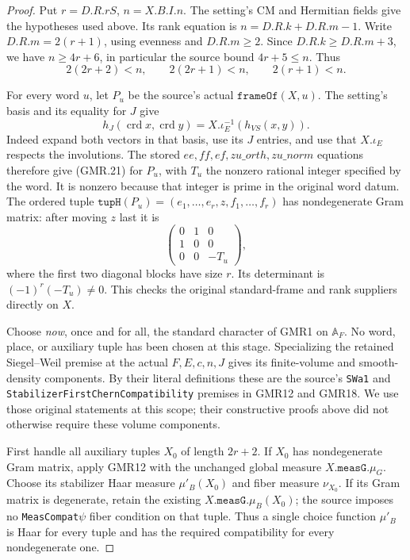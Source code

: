 \begin{proof}
Put $r=D.R.rS$, $n=X.B.I.n$.  The setting's CM and Hermitian fields
give the hypotheses used above.  Its rank equation is
$n=D.R.k+D.R.m-1$.  Write $D.R.m=2(r+1)$, using evenness and
$D.R.m\geq2$.  Since $D.R.k\geq D.R.m+3$, we have
$n\geq4r+6$, in particular the source bound $4r+5\leq n$.
Thus
\[
 2(2r+2)<n,\qquad 2(2r+1)<n,\qquad 2(r+1)<n.
 \tag{GMR.30}
\]

For every word $u$, let $P_u$ be the source's actual
$\texttt{frameOf}(X,u)$.  The setting's basis and its equality for
$J$ give
\[
 h_J(\operatorname{crd}x,\operatorname{crd}y)
   =X.\iota_E^{-1}(h_{VS}(x,y)).
 \tag{GMR.31}
\]
Indeed expand both vectors in that basis, use its $J$ entries, and
use that $X.\iota_E$ respects the involutions.  The stored
$ee,ff,ef,zu\_orth,zu\_norm$ equations therefore give (GMR.21)
for $P_u$, with $T_u$ the nonzero rational integer specified by the
word.  It is nonzero because that integer is prime in the original
word datum.  The ordered tuple
$\texttt{tupH}(P_u)=(e_1,\ldots,e_r,z,f_1,\ldots,f_r)$ has
nondegenerate Gram matrix: after moving $z$ last it is
\[
 \begin{pmatrix}0&1&0\\1&0&0\\0&0&-T_u\end{pmatrix},
 \tag{GMR.32}
\]
where the first two diagonal blocks have size $r$.  Its determinant
is $(-1)^r(-T_u)\ne0$.  This checks the original standard-frame
and rank suppliers directly on $X$.

Choose \emph{now}, once and for all, the standard character of GMR1
on $\mathbb A_F$.  No word, place, or auxiliary tuple has been chosen
at this stage.  Specializing the retained Siegel--Weil premise at
the actual $F,E,c,n,J$ gives its finite-volume and smooth-density
components.  By their literal definitions these are the source's
\texttt{SWa1} and \texttt{StabilizerFirstChernCompatibility} premises
in GMR12 and GMR18.  We use those original statements at this scope;
their constructive proofs above did not otherwise require these
volume components.

First handle all auxiliary tuples $X_0$ of length $2r+2$.
If $X_0$ has nondegenerate Gram matrix, apply GMR12 with the
unchanged global measure $X.\texttt{measG}.\mu_G$.
Choose its stabilizer Haar measure $\mu'_B(X_0)$ and fiber measure
$\nu_{X_0}$.  If its Gram matrix is degenerate, retain the existing
$X.\texttt{measG}.\mu_B(X_0)$; the source imposes no
\texttt{MeasCompat\ensuremath{\psi}} fiber condition on that tuple.
Thus a single choice function $\mu'_B$ is Haar for every tuple and
has the required compatibility for every nondegenerate one.


\end{proof}

